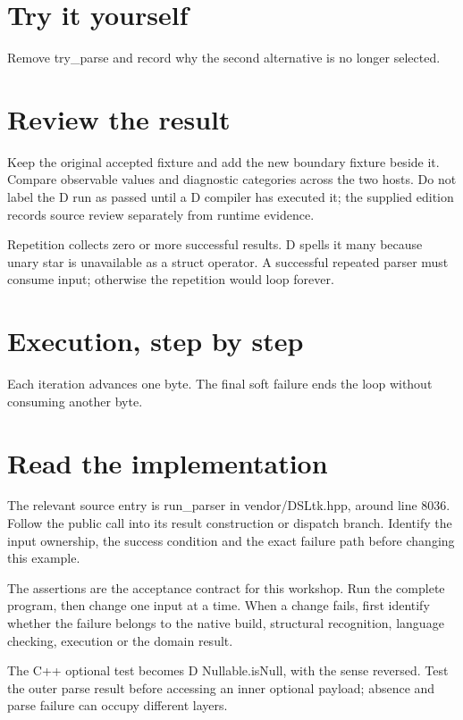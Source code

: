 \section*{Try it yourself}
Remove try\_parse and record why the second alternative is no longer selected.

\section*{Review the result}
Keep the original accepted fixture and add the new boundary fixture beside it. Compare observable values and diagnostic categories across the two hosts. Do not label the D run as passed until a D compiler has executed it; the supplied edition records source review separately from runtime evidence.

\clearpage
{}
Repetition collects zero or more successful results. D spells it many because unary star is unavailable as a struct operator. A successful repeated parser must consume input; otherwise the repetition would loop forever.


\section*{Execution, step by step}
Each iteration advances one byte. The final soft failure ends the loop without consuming another byte.

\section*{Read the implementation}
The relevant source entry is run\_parser in vendor/DSLtk.hpp, around line 8036. Follow the public call into its result construction or dispatch branch. Identify the input ownership, the success condition and the exact failure path before changing this example.

The assertions are the acceptance contract for this workshop. Run the complete program, then change one input at a time. When a change fails, first identify whether the failure belongs to the native build, structural recognition, language checking, execution or the domain result.

\clearpage
{}
The C++ optional test becomes D Nullable.isNull, with the sense reversed. Test the outer parse result before accessing an inner optional payload; absence and parse failure can occupy different layers.


